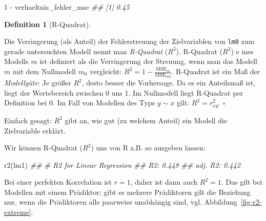 \documentclass[
  letterpaper,
]{scrbook}
\newenvironment{Shaded}{\begin{snugshade}}{\end{snugshade}}
\newcommand{\DecValTok}[1]{\textcolor[rgb]{0.68,0.00,0.00}{#1}}
\newcommand{\DocumentationTok}[1]{\textcolor[rgb]{0.37,0.37,0.37}{\textit{#1}}}
\newcommand{\FunctionTok}[1]{\textcolor[rgb]{0.28,0.35,0.67}{#1}}
\newcommand{\NormalTok}[1]{\textcolor[rgb]{0.00,0.23,0.31}{#1}}
\newcommand{\SpecialCharTok}[1]{\textcolor[rgb]{0.37,0.37,0.37}{#1}}
\theoremstyle{definition}
\theoremstyle{definition}
\theoremstyle{definition}
\newtheorem{definition}{Definition}[chapter]
\theoremstyle{remark}
\begin{document}
\begin{Shaded}
\begin{Highlighting}[]
\DecValTok{1} \SpecialCharTok{{-}}\NormalTok{ verhaeltnis\_fehler\_mse}
\DocumentationTok{\#\# [1] 0.45}
\end{Highlighting}
\end{Shaded}

\begin{definition}[R-Quadrat]\protect\hypertarget{def-r2}{}\label{def-r2}

Die Verringerung (als Anteil) der Fehlerstreuung der Zielvariablen von
\texttt{lm0} zum gerade untersuchten Modell nennt man \emph{R-Quadrat}
(\(R^2\)). R-Quadrat (\(R^2\)) e ines Modells \(m\) ist definiert als
die Verringerung der Streuung, wenn man das Modell \(m\) mit dem
Nullmodell \(m_0\) vergleicht:
\(R^2 =1-  \frac{\text{MSE}_{m}}{\text{MSE}_{m0}}\). R-Quadrat ist ein
Maß der \emph{Modellgüte}: Je größer \(R^2\), desto besser die
Vorhersage. Da es ein Anteilsmaß ist, liegt der Wertebereich zwischen 0
uns 1. Im Nullmodell liegt R-Quadrat per Definition bei 0. Im Fall von
Modellen des Typs \(y\sim x\) gilt: \(R^2 = r_{xy}^2\). \(\square\)

\end{definition}

Einfach gesagt: \(R^2\) gibt an, wie gut (zu welchem Anteil) ein Modell
die Zielvariable erklärt.

Wir können R-Quadrat (\(R^2\)) uns von R z.B. so ausgeben lassen:

\begin{Shaded}
\begin{Highlighting}[]
\FunctionTok{r2}\NormalTok{(lm1)}
\DocumentationTok{\#\# \# R2 for Linear Regression}
\DocumentationTok{\#\#        R2: 0.448}
\DocumentationTok{\#\#   adj. R2: 0.442}
\end{Highlighting}
\end{Shaded}

Bei einer perfekten Korrelation ist \(r=1\), daher ist dann auch
\(R^2 = 1\). Das gilt bei Modellen mit einem Prädiktor; gibt es mehrere
Prädiktoren gilt die Beziehung nur, wenn die Prädiktoren alle paarweise
unabhängig sind, vgl. Abbildung~\ref{fig-r2-extreme}.
\end{document}
